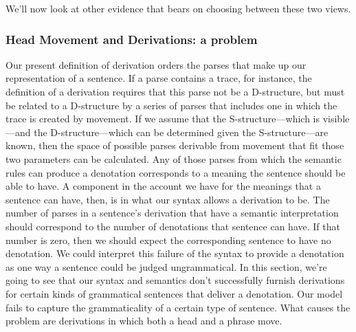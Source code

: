 We'll now look at other evidence that bears on choosing between these two views.

\subsubsection{Head Movement and Derivations: a problem}
\label{sec:ordering}

Our present definition of derivation orders the parses that make up our representation of a sentence. If a parse contains a trace, for instance, the definition of a derivation requires that this parse not be a D-structure, but must be related to a D-structure by a series of parses that includes one in which the trace is created by movement. If we assume that the S-structure---which is visible---and the D-structure---which can be determined given the S-structure---are known, then the space of possible parses derivable from movement that fit those two parameters can be calculated. Any of those parses from which the semantic rules can produce a denotation corresponds to a meaning the sentence should be able to have. A component in the account we have for the meanings that a sentence can have, then, is in what our syntax allows a derivation to be. The number of parses in a sentence's derivation that have a semantic interpretation should correspond to the number of denotations that sentence can have. If that number is zero, then we should expect the corresponding sentence to have no denotation. We could interpret this failure of the syntax to provide a denotation as one way a sentence could be judged ungrammatical. In this section, we're going to see that our syntax and semantics don't successfully furnish derivations for certain kinds of grammatical sentences that deliver a denotation. Our model fails to capture the grammaticality of a certain type of sentence. What causes the problem are derivations in which both a head and a phrase move.

